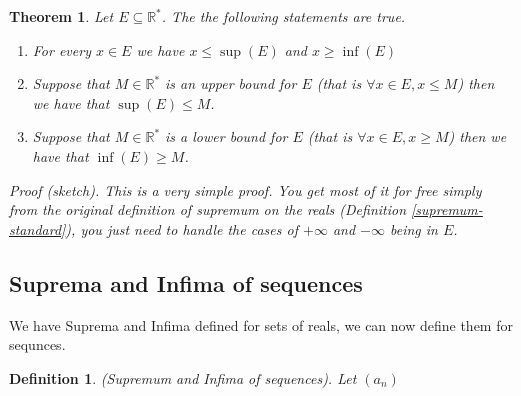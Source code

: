 \documentclass{article}
\newtheorem{definition}{Definition}[subsection]
\newtheorem{theorem}{Theorem}[subsection]
\newcommand{\R}{\mathbb{R}}
\let\it\textit
\begin{document}
\begin{theorem}
	Let $E \subseteq \R^*$. The the following 
	statements are true.
	\begin{enumerate}[label=(\alph*)]
		\item For every $x \in E$ 
			we have $x \leq \sup(E)$ 
			and $x \geq \inf(E)$
		\item Suppose that $M \in \R^*$ is 
			an upper bound for $E$ 
			(that is $\forall x \in E, x \leq M$) 
			then we have that $\sup(E) \leq M$. 
		\item Suppose that $M \in \R^*$ is a lower 
			bound for $E$ 
			(that is $\forall x \in E, x \geq M$) 
			then we have that $\inf(E) \geq M$.
	\end{enumerate}

	\it{Proof} (sketch). This is a very simple proof. 
	You get most of it for free simply from 
	the original definition of supremum 
	on the reals (Definition \ref{supremum-standard}),
	you just need to handle the cases of 
	$+ \infty$ and $- \infty$ being in $E$.
\end{theorem}


\subsection{Suprema and Infima of sequences} 

We have Suprema and Infima defined for sets of reals, 
we can now define them for sequnces. 

\begin{definition}
	(Supremum and Infima of sequences). Let 
	$(a_n)$
\end{definition}
\end{document}
